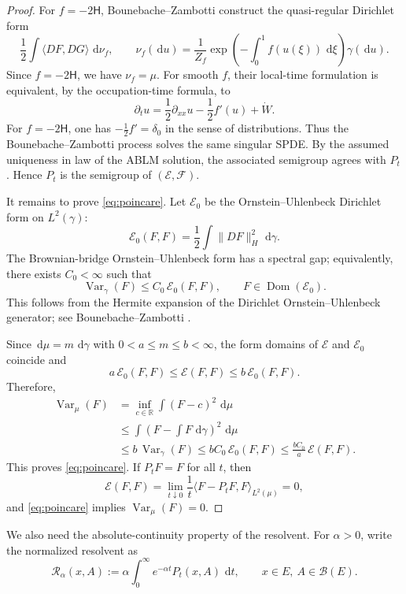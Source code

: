 \documentclass[12pt]{article}
\numberwithin{equation}{section}
\newcommand{\dd}{\,\mathrm d}
\newcommand{\1}{\mathbf 1}
\newcommand{\R}{\mathbb R}
\newcommand{\cB}{\mathcal B}
\newcommand{\cE}{\mathcal E}
\newcommand{\cF}{\mathcal F}
\newcommand{\Var}{\operatorname{Var}}
\begin{document}
\begin{proof}
For $f=-2\mathsf H$, Bounebache--Zambotti \cite[Propositions 2.4 and 3.1]{BZ14}
construct the quasi-regular Dirichlet form
\[
        \frac12\int \langle DF,DG\rangle\,\dd\nu_f,
        \qquad
        \nu_f(\dd u)=\frac1{Z_f}\exp\!\left(-\int_0^1 f(u(\xi))\,\dd\xi\right)\gamma(\dd u).
\]
Since $f=-2\mathsf H$, we have $\nu_f=\mu$. For smooth $f$, their local-time
formulation is equivalent, by the occupation-time formula, to
\[
        \partial_t u=\frac12\partial_{xx}u-\frac12 f'(u)+\dot W.
\]
For $f=-2\mathsf H$, one has $-\frac12 f'=\delta_0$ in the sense of distributions.
Thus the Bounebache--Zambotti process solves the same singular SPDE. By the
assumed uniqueness in law of the ABLM solution, the associated semigroup agrees
with $P_t$. Hence $P_t$ is the semigroup of $(\cE,\cF)$.

It remains to prove \eqref{eq:poincare}. Let $\cE_0$ be the Ornstein--Uhlenbeck
Dirichlet form on $L^2(\gamma)$:
\[
        \cE_0(F,F)=\frac12\int \|DF\|_H^2\,\dd\gamma .
\]
The Brownian-bridge Ornstein--Uhlenbeck form has a spectral gap; equivalently,
there exists $C_0<\infty$ such that
\[
        \Var_\gamma(F)\leq C_0\,\cE_0(F,F),
        \qquad F\in\operatorname{Dom}(\cE_0).
\]
This follows from the Hermite expansion of the Dirichlet Ornstein--Uhlenbeck
generator; see Bounebache--Zambotti \cite[Proposition 2.1]{BZ14}.

Since $\dd\mu=m\,\dd\gamma$ with $0<a\leq m\leq b<\infty$, the form domains of
$\cE$ and $\cE_0$ coincide and
\[
        a\,\cE_0(F,F)\leq \cE(F,F)\leq b\,\cE_0(F,F).
\]
Therefore,
\[
\begin{aligned}
        \Var_\mu(F)
        &=\inf_{c\in\R}\int (F-c)^2\,\dd\mu                                      \\
        &\leq \int \left(F-\int F\,\dd\gamma\right)^2\,\dd\mu                       \\
        &\leq b\,\Var_\gamma(F)
        \leq bC_0\,\cE_0(F,F)
        \leq \frac{bC_0}{a}\,\cE(F,F).
\end{aligned}
\]
This proves \eqref{eq:poincare}. If $P_tF=F$ for all $t$, then
\[
        \cE(F,F)
        =
        \lim_{t\downarrow0}\frac1t\langle F-P_tF,F\rangle_{L^2(\mu)}
        =0,
\]
and \eqref{eq:poincare} implies $\Var_\mu(F)=0$.
\end{proof}

We also need the absolute-continuity property of the resolvent. For $\alpha>0$,
write the normalized resolvent as
\[
        \mathcal R_\alpha(x,A)
        :=
        \alpha\int_0^\infty e^{-\alpha t}P_t(x,A)\,\dd t,
        \qquad x\in E,\ A\in\cB(E).
\]
\end{document}
